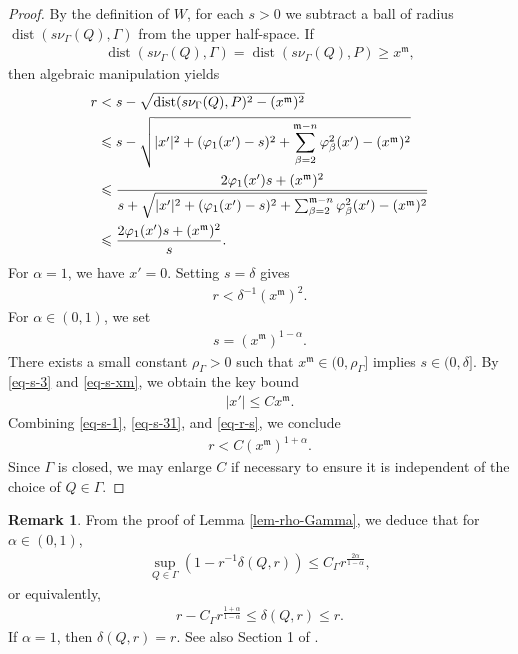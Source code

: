 \documentclass[11pt,reqno]{amsart}
\newcommand{\fm}{\mathfrak{m}}
\renewcommand{\leq}{\leqslant}
\renewcommand{\geq}{\geqslant}
\theoremstyle{definition}
\newtheorem{remark}[theorem]{Remark}
\numberwithin{equation}{section}
\begin{document}
\begin{proof}
By the definition of $W$, for each $s>0$ we subtract a ball of radius $\operatorname{dist}(s\nu_\Gamma(Q), \Gamma)$ from the upper half-space. If
\begin{align}
\operatorname{dist}(s\nu_\Gamma(Q), \Gamma) = \operatorname{dist}(s\nu_\Gamma(Q), P) \geq x^\fm,
\end{align}
then algebraic manipulation yields
\begin{align}
r &< s - \sqrt{\operatorname{dist}(s\nu_\Gamma(Q), P)^2 - (x^\fm)^2} \notag \\
&\leq s - \sqrt{|x'|^2 + (\varphi_1(x')-s)^2 + \sum_{\beta=2}^{\fm-n}\varphi_\beta^2(x') - (x^\fm)^2} \notag \\
&\leq \frac{2\varphi_1(x') s + (x^\fm)^2}{s + \sqrt{|x'|^2 + (\varphi_1(x')-s)^2 + \sum_{\beta=2}^{\fm-n}\varphi_\beta^2(x') - (x^\fm)^2}} \notag \\
&\leq \frac{2\varphi_1(x') s + (x^\fm)^2}{s}.
\label{eq-r-s}
\end{align}
For $\alpha = 1$, we have $x' = 0$. Setting $s = \delta$ gives
\begin{align}
r < \delta^{-1}(x^\fm)^2.
\end{align}
For $\alpha \in (0,1)$, we set
\begin{align}\label{eq-s-xm}
    s = (x^\fm)^{1-\alpha}.
\end{align}
 There exists a small constant $\rho_\Gamma>0$ such that $x^\fm \in (0, \rho_\Gamma]$ implies $s \in (0, \delta]$. By \eqref{eq-s-3} and \eqref{eq-s-xm}, we obtain the key bound
\begin{align}\label{eq-s-31}
|x'| \leq C x^\fm.
\end{align}
Combining \eqref{eq-s-1}, \eqref{eq-s-31}, and \eqref{eq-r-s}, we conclude
\begin{align}
r < C (x^\fm)^{1+\alpha}.
\end{align}
Since $\Gamma$ is closed, we may enlarge $C$ if necessary to ensure it is independent of the choice of $Q\in \Gamma$.
\end{proof}

\begin{remark}
    From the proof of Lemma \ref{lem-rho-Gamma}, we deduce that for $\alpha\in (0,1)$,
    \begin{align}\label{eq-r-delta-1}
    \sup_{Q\in \Gamma}\left(1 - r^{-1}\delta(Q, r)\right) \leq C_\Gamma r^{\frac{2\alpha}{1-\alpha}},
    \end{align}
    or equivalently,
\begin{align}\label{eq-r-delta-2}
    r - C_\Gamma r^{\frac{1+\alpha}{1-\alpha}} \leq \delta(Q, r) \leq r.
    \end{align}
    If $\alpha=1$, then $\delta(Q,r) = r$. See also Section 1 of \cite{Hardt&Lin1987}.
\end{remark}
\end{document}
